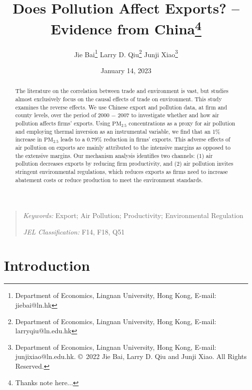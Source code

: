 \documentclass[12pt]{article}
\begin{document}
\title{Does Pollution Affect Exports? -- Evidence from China\thanks{%
Thanks note here...}}
\author{Jie Bai\thanks{%
Department of Economics, Lingnan University, Hong Kong, E-mail: jiebai@ln.hk}
\quad Larry D. Qiu\thanks{%
Department of Economics, Lingnan University, Hong Kong, E-mail:
larryqiu@ln.edu.hk} \quad Junji Xiao\thanks{%
Department of Economics, Lingnan University, Hong Kong, E-mail:
junjixiao@ln.edu.hk. \copyright\ 2022 Jie Bai, Larry D. Qiu and Junji Xiao.
All Rights Reserved. }}
\date{January 14, 2023}
\maketitle

\begin{abstract}
The literature on the correlation between trade and environment is vast, but
studies almost exclusively focus on the causal effects of trade on
environment. This study examines the reverse effects. We use Chinese export
and pollution data, at firm and county levels, over the period of 2000 $-$ 2007
to investigate whether and how air pollution affects firms' exports. Using $%
\mathrm{PM_{2.5}}$ concentrations as a proxy for air pollution and employing
thermal inversion as an instrumental variable, we find that an 1\% increase
in $\mathrm{PM_{2.5}}$ leads to a 0.79\% reduction in firms' exports. This
adverse effects of air pollution on exports are mainly attributed to the
intensive margins as opposed to the extensive margins. Our mechanism
analysis identifies two channels: (1) air pollution decreases exports by
reducing firm productivity, and (2) air pollution invites stringent
environmental regulations, which reduces exports as firms need to increase
abatement costs or reduce production to meet the environment standards.
\end{abstract}

\begin{quote}
\emph{Keywords:} Export; Air Pollution; Productivity; Environmental 
Regulation 

\emph{JEL Classification:} F14, F18, Q51 
\end{quote}

\newpage  \setcounter{page}{1} 

\section{Introduction}
\end{document}
